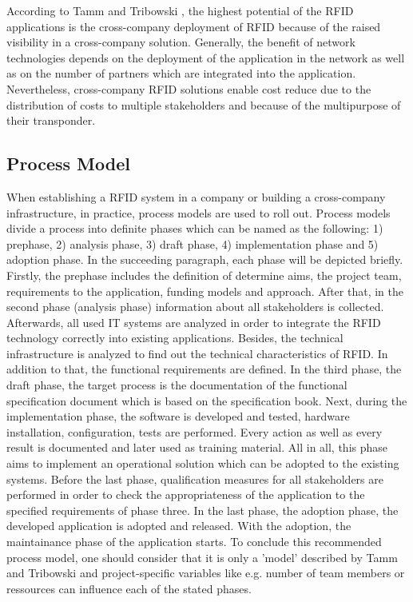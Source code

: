 According to Tamm and Tribowski \cite[p.95 ff.]{fokus}, the highest potential of the RFID applications is the cross-company deployment of RFID because of the raised visibility in a cross-company solution. Generally, the benefit of network technologies depends on the deployment of the application in the network as well as on the number of partners which are integrated into the application. Nevertheless, cross-company RFID solutions enable cost reduce due to the distribution of costs to multiple stakeholders and because of the multipurpose of their transponder.

\subsection{Process Model}

When establishing a RFID system in a company or building a cross-company infrastructure, in practice, process models are used to roll out. Process models divide a process into definite phases \cite[p.59 ff.]{fokus} which can be named as the following: 1) prephase, 2) analysis phase, 3) draft phase, 4) implementation phase and 5) adoption phase. In the succeeding paragraph, each phase will be depicted briefly.
Firstly, the prephase includes the definition of determine aims, the project team, requirements to the application, funding models and approach. After that, in the second phase (analysis phase) information about all stakeholders is collected. Afterwards, all used IT systems are analyzed in order to integrate the RFID technology correctly into existing applications. Besides, the technical infrastructure is analyzed to find out the technical characteristics of RFID. In addition to that, the functional requirements are defined.
In the third phase, the draft phase, the target process is the documentation of the functional specification document which is based on the specification book. Next, during the implementation phase, the software is developed and tested, hardware installation, configuration, tests are performed. Every action as well as every result is documented and later used as training material. All in all, this phase aims to implement an operational solution which can be adopted to the existing systems. 
Before the last phase, qualification measures for all stakeholders are performed in order to check the appropriateness of the application to the specified requirements of phase three.
In the last phase, the adoption phase, the developed application is adopted and released. With the adoption, the maintainance phase of the application starts.
To conclude this recommended process model, one should consider that it is only a 'model' described by Tamm and Tribowski \cite[p.59 ff.]{fokus}and project-specific variables like e.g. number of team members or ressources can influence each of the stated phases.

